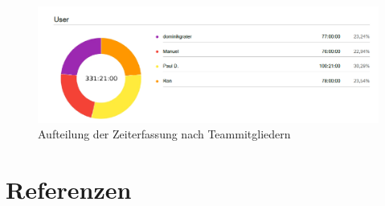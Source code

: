 \documentclass[11pt,a4paper]{article}
\begin{document}
\begin{figure}[H]
    \centering
    \includegraphics[width=\textwidth]{images/clockify_piechart.png}
    \caption{Aufteilung der Zeiterfassung nach Teammitgliedern}
    \label{fig:piechart}
\end{figure}



\newpage
\section{Referenzen}
\end{document}
